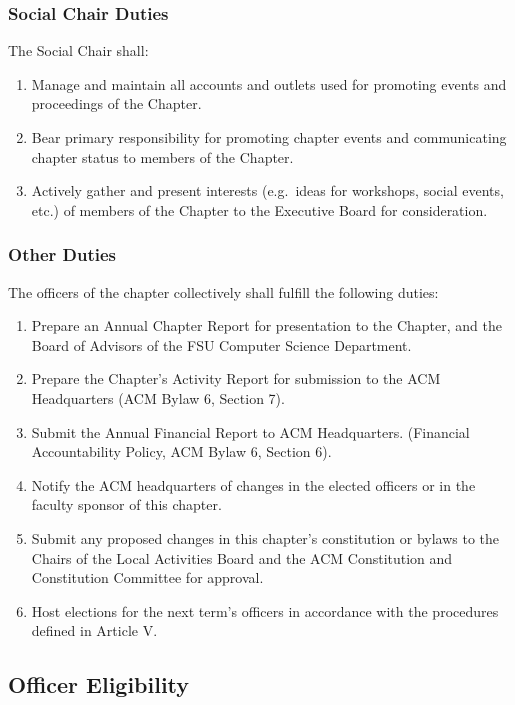 \documentclass{article}
\begin{document}
\subsubsection{Social Chair Duties}

The Social Chair shall:

\begin{enumerate}
\item
  Manage and maintain all accounts and outlets used for promoting events
  and proceedings of the Chapter.
\item
  Bear primary responsibility for promoting chapter events and
  communicating chapter status to members of the Chapter.
\item
  Actively gather and present interests (e.g.~ideas for workshops,
  social events, etc.) of members of the Chapter to the Executive Board
  for consideration.
\end{enumerate}


\subsubsection{Other Duties}

The officers of the chapter collectively shall fulfill the following
duties:

\begin{enumerate}
\item
  Prepare an Annual Chapter Report for presentation to the Chapter, and
  the Board of Advisors of the FSU Computer Science Department.
\item
  Prepare the Chapter's Activity Report for submission to the ACM
  Headquarters (ACM Bylaw 6, Section 7).
\item
  Submit the Annual Financial Report to ACM Headquarters. (Financial
  Accountability Policy, ACM Bylaw 6, Section 6).
\item
  Notify the ACM headquarters of changes in the elected officers or in
  the faculty sponsor of this chapter.
\item
  Submit any proposed changes in this chapter's constitution or bylaws
  to the Chairs of the Local Activities Board and the ACM Constitution
  and Constitution Committee for approval.
\item
  Host elections for the next term's officers in accordance with the
  procedures defined in Article V.
\end{enumerate}


\subsection{Officer Eligibility}
\end{document}

